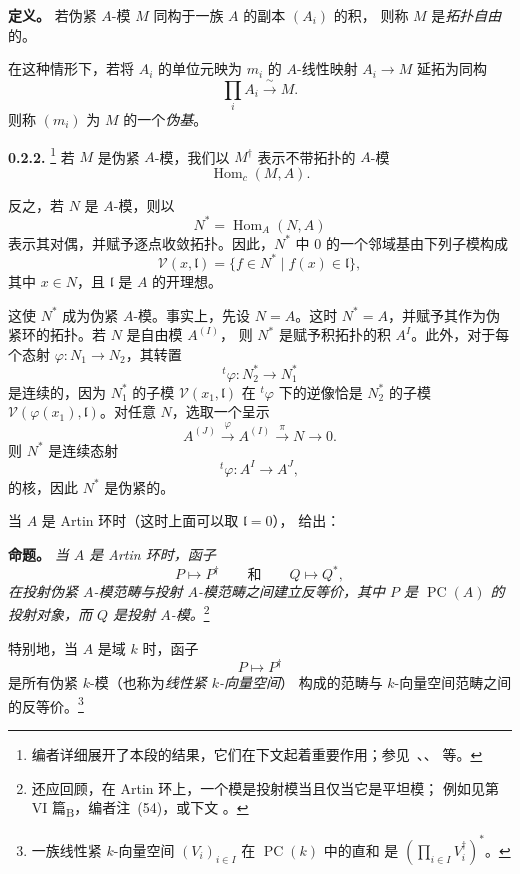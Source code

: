 \medskip
\noindent\textbf{定义。}
\label{sga3:VIIB:0.2.1:topologically-free}
若伪紧 \(A\)-模 \(M\) 同构于一族 \(A\) 的副本 \((A_i)\) 的积，
则称 \(M\) 是\emph{拓扑自由}的。

在这种情形下，若将 \(A_i\) 的单位元映为 \(m_i\) 的 \(A\)-线性映射
\(A_i\longrightarrow M\) 延拓为同构
\[
  \prod_i A_i\xrightarrow{\ \sim\ }M.
\]
则称 \((m_i)\) 为 \(M\) 的一个\emph{伪基}。

\medskip
\noindent\textbf{0.2.2.}
\label{sga3:VIIB:0.2.2}
\footnote{\label{sga3:VIIB:nde:14}编者详细展开了本段的结果，它们在下文起着重要作用；参见\
、、
\SGARefLink{sga3:VIIB:2.2.1}{2.2.1} 等。}
若 \(M\) 是伪紧 \(A\)-模，我们以 \(M^\dagger\) 表示不带拓扑的 \(A\)-模
\[
  \operatorname{Hom}_c(M,A).
\]

反之，若 \(N\) 是 \(A\)-模，则以
\[
  N^*=\operatorname{Hom}_A(N,A)
\]
表示其对偶，并赋予逐点收敛拓扑。因此，\(N^*\) 中 \(0\) 的一个邻域基由下列子模构成
\[
  \mathcal V(x,\mathfrak l)
  =
  \{f\in N^*\mid f(x)\in\mathfrak l\},
\]
其中 \(x\in N\)，且 \(\mathfrak l\) 是 \(A\) 的开理想。

这使 \(N^*\) 成为伪紧 \(A\)-模。事实上，先设 \(N=A\)。这时
\(N^*=A\)，并赋予其作为伪紧环的拓扑。若 \(N\) 是自由模 \(A^{(I)}\)，
则 \(N^*\) 是赋予积拓扑的积 \(A^I\)。此外，对于每个态射
\(\varphi:N_1\longrightarrow N_2\)，其转置
\[
  {}^t\!\varphi:N_2^*\longrightarrow N_1^*
\]
是连续的，因为 \(N_1^*\) 的子模 \(\mathcal V(x_1,\mathfrak l)\)
在 \({}^t\!\varphi\) 下的逆像恰是 \(N_2^*\) 的子模
\(\mathcal V(\varphi(x_1),\mathfrak l)\)。对任意 \(N\)，选取一个呈示
\[
  A^{(J)}
  \xrightarrow{\ \varphi\ }
  A^{(I)}
  \xrightarrow{\ \pi\ }
  N
  \longrightarrow
  0.
\]
则 \(N^*\) 是连续态射
\[
  {}^t\!\varphi:A^I\longrightarrow A^J,
\]
的核，因此 \(N^*\) 是伪紧的。

当 \(A\) 是 Artin 环时（这时上面可以取 \(\mathfrak l=0\)），
 给出：

\medskip
\noindent\textbf{命题。}
\label{sga3:VIIB:0.2.2:artinian-duality}
\textit{当 \(A\) 是 Artin 环时，函子}
\[
  P\longmapsto P^\dagger
  \qquad\textit{和}\qquad
  Q\longmapsto Q^*,
\]
\textit{在投射伪紧 \(A\)-模范畴与投射 \(A\)-模范畴之间建立反等价，其中
\(P\) 是 \(\operatorname{PC}(A)\) 的投射对象，而 \(Q\) 是投射 \(A\)-模。}\footnote{\label{sga3:VIIB:nde:15}还应回顾，在 Artin 环上，一个模是投射模当且仅当它是平坦模；
例如见第 VI 篇\textsubscript{B}，编者注~(54)，或下文
。}

特别地，当 \(A\) 是域 \(k\) 时，函子
\[
  P\longmapsto P^\dagger
\]
是所有伪紧 \(k\)-模（也称为\emph{线性紧 \(k\)-向量空间}）
构成的范畴与 \(k\)-向量空间范畴之间的反等价。\footnote{
\label{sga3:VIIB:nde:16}一族线性紧 \(k\)-向量空间 \((V_i)_{i\in I}\) 在 \(\operatorname{PC}(k)\) 中的直和
是 \(\left(\prod_{i\in I}V_i^\dagger\right)^*\)。}

